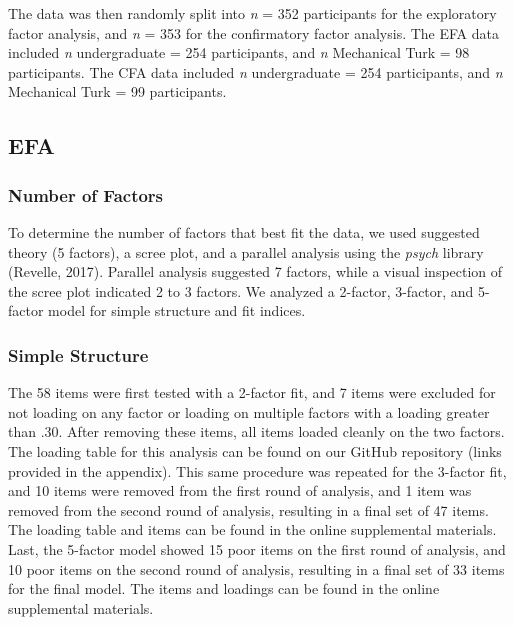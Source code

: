 \documentclass[
  english,
  man]{apa6}
\begin{document}
The data was then randomly split into \emph{n} = 352 participants
for the exploratory factor analysis, and \emph{n} = 353 for the
confirmatory factor analysis. The EFA data included \emph{n} undergraduate =
254 participants, and
\emph{n} Mechanical Turk =
98 participants. The
CFA data included \emph{n} undergraduate =
254 participants, and
\emph{n} Mechanical Turk =
99 participants.

\subsection{EFA}\label{efa}

\subsubsection{Number of Factors}\label{number-of-factors}

To determine the number of factors that best fit the data, we used
suggested theory (5 factors), a scree plot, and a parallel analysis
using the \emph{psych} library (Revelle, 2017). Parallel analysis suggested 7
factors, while a visual inspection of the scree plot indicated 2 to 3
factors. We analyzed a 2-factor, 3-factor, and 5-factor model for simple
structure and fit indices.

\subsubsection{Simple Structure}\label{simple-structure}

The 58 items were first tested with a 2-factor fit, and
7 items were excluded for not loading on any factor
or loading on multiple factors with a loading greater than .30. After
removing these items, all items loaded cleanly on the two factors. The
loading table for this analysis can be found on our GitHub repository (links provided in the appendix). This same procedure
was repeated for the 3-factor fit, and 10 items
were removed from the first round of analysis, and
1 item was removed from the second round of
analysis, resulting in a final set of 47 items.
The loading table and items can be found in the online supplemental materials. Last, the 5-factor model
showed 15 poor items on the
first round of analysis, and 10
poor items on the second round of analysis, resulting in a final set of
33 items for the final model. The items and loadings can
be found in the online supplemental materials.
\end{document}
